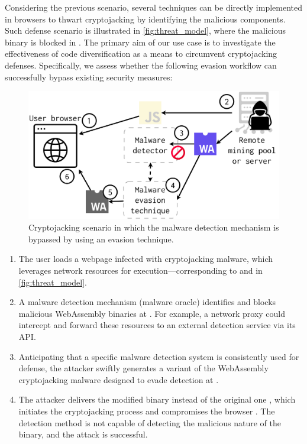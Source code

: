 \label{threat_model}


Considering the previous scenario, several techniques can be directly implemented in browsers to thwart cryptojacking by identifying the malicious \Wasm components. 
Such defense scenario is illustrated in \autoref{fig:threat_model}, where the \Wasm malicious binary is blocked in .
The primary aim of our use case is to investigate the effectiveness of code diversification as a means to circumvent cryptojacking defenses. 
Specifically, we assess whether the following evasion workflow can successfully bypass existing security measures:

\begin{figure}
    \centering
    \includegraphics[width=0.8\linewidth]{figures/threat_model.pdf}
    \caption{Cryptojacking scenario in which the malware detection mechanism is bypassed by using an evasion technique.}
    \label{fig:threat_model}
\end{figure}


\begin{enumerate}
    
    \item The user loads a webpage infected with cryptojacking malware, which leverages network resources for execution—corresponding to  and  in \autoref{fig:threat_model}. 
    
    \item A malware detection mechanism (malware oracle) identifies and blocks malicious WebAssembly binaries at . 
    For example, a network proxy could intercept and forward these resources to an external detection service via its API.
    
    \item Anticipating that a specific malware detection system is consistently used for defense, the attacker swiftly generates a variant of the WebAssembly cryptojacking malware designed to evade detection at .
    
    \item The attacker delivers the modified binary instead of the original one , which initiates the cryptojacking process and compromises the browser . The detection method is not capable of detecting the malicious nature of the binary, and the attack is successful.
    
\end{enumerate}


